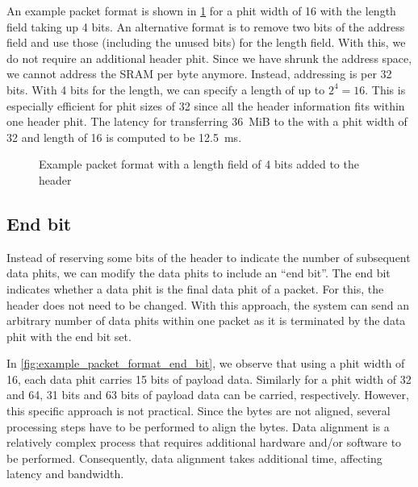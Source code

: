 An example packet format is shown in \cref{fig:example_packet_format_length_field} for a phit width of 16 with the length field taking up 4 bits.
An alternative format is to remove two bits of the address field and use those (including the unused bits) for the length field.
With this, we do not require an additional header phit.
Since we have shrunk the address space, we cannot address the SRAM per byte anymore.
Instead, addressing is per 32 bits.
With 4 bits for the length, we can specify a length of up to $2^4 = 16$.
This is especially efficient for phit sizes of 32 since all the header information fits within one header phit.
The latency for transferring \SI{36}{MiB} to the \graicore{} with a phit width of 32 and length of 16 is computed to be \SI{12.5}{ms}.

\hspace*{0.5em}
\begin{figure}[hbtp]
    \centering
    \begin{adjustbox}{width=0.8\linewidth}
        
    \end{adjustbox}
    \caption{Example packet format with a length field of 4 bits added to the header}
    \label{fig:example_packet_format_length_field}
\end{figure}

\subsection{End bit}
Instead of reserving some bits of the header to indicate the number of subsequent data phits, we can modify the data phits to include an ``end bit''.
The end bit indicates whether a data phit is the final data phit of a packet.
For this, the header does not need to be changed.
With this approach, the system can send an arbitrary number of data phits within one packet as it is terminated by the data phit with the end bit set.

In \cref{fig:example_packet_format_end_bit}, we observe that using a phit width of 16, each data phit carries 15 bits of payload data.
Similarly for a phit width of 32 and 64, 31 bits and 63 bits of payload data can be carried, respectively.
However, this specific approach is not practical.
Since the bytes are not aligned, several processing steps have to be performed to align the bytes.
Data alignment is a relatively complex process that requires additional hardware and/or software to be performed.
Consequently, data alignment takes additional time, affecting latency and bandwidth. 


